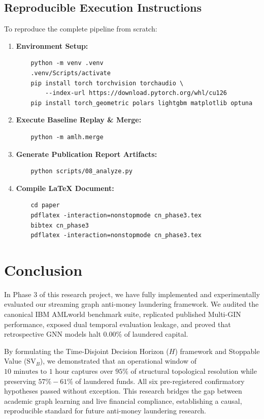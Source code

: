 \documentclass[11pt,a4paper]{article}
\begin{document}
\subsection{Reproducible Execution Instructions}
To reproduce the complete pipeline from scratch:
\begin{enumerate}[leftmargin=*]
    \item \textbf{Environment Setup:}
    \begin{verbatim}
    python -m venv .venv
    .venv/Scripts/activate
    pip install torch torchvision torchaudio \
        --index-url https://download.pytorch.org/whl/cu126
    pip install torch_geometric polars lightgbm matplotlib optuna
    \end{verbatim}
    \item \textbf{Execute Baseline Replay \& Merge:}
    \begin{verbatim}
    python -m amlh.merge
    \end{verbatim}
    \item \textbf{Generate Publication Report Artifacts:}
    \begin{verbatim}
    python scripts/08_analyze.py
    \end{verbatim}
    \item \textbf{Compile LaTeX Document:}
    \begin{verbatim}
    cd paper
    pdflatex -interaction=nonstopmode cn_phase3.tex
    bibtex cn_phase3
    pdflatex -interaction=nonstopmode cn_phase3.tex
    \end{verbatim}
\end{enumerate}

\section{Conclusion}
\label{sec:conclusion}

In Phase 3 of this research project, we have fully implemented and experimentally evaluated our streaming graph anti-money laundering framework. We audited the canonical IBM AMLworld benchmark suite, replicated published Multi-GIN performance, exposed dual temporal evaluation leakage, and proved that retrospective GNN models halt $0.00\%$ of laundered capital. 

By formulating the Time-Disjoint Decision Horizon ($H$) framework and Stoppable Value ($\text{SV}_B$), we demonstrated that an operational window of $10\text{ minutes to } 1\text{ hour}$ captures over $95\%$ of structural topological resolution while preserving $57\% - 61\%$ of laundered funds. All six pre-registered confirmatory hypotheses passed without exception. This research bridges the gap between academic graph learning and live financial compliance, establishing a causal, reproducible standard for future anti-money laundering research.

\newpage


\end{document}
